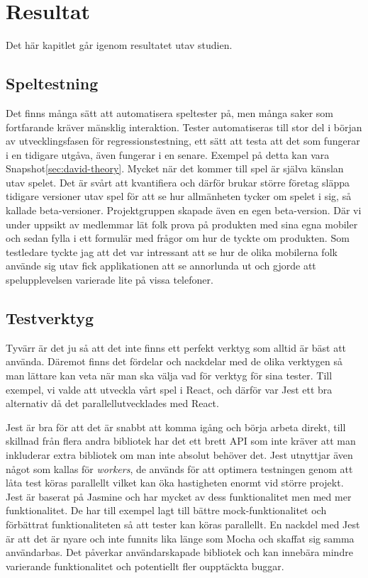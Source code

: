 \section{Resultat}
\label{sec:david-results}
Det här kapitlet går igenom resultatet utav studien.

\subsection{Speltestning}
Det finns många sätt att automatisera speltester på, men många saker som fortfarande kräver mänsklig interaktion. Tester automatiseras till stor del i början av utvecklingsfasen för regressionstestning, ett sätt att testa att det som fungerar i en tidigare utgåva, även fungerar i en senare. Exempel på detta kan vara Snapshot\ref{sec:david-theory}. Mycket när det kommer till spel är själva känslan utav spelet. Det är svårt att kvantifiera och därför brukar större företag släppa tidigare versioner utav spel för att se hur allmänheten tycker om spelet i sig, så kallade beta-versioner. Projektgruppen skapade även en egen beta-version. Där vi under uppsikt av medlemmar lät folk prova på produkten med sina egna mobiler och sedan fylla i ett formulär med frågor om hur de tyckte om produkten. Som testledare tyckte jag att det var intressant att se hur de olika mobilerna folk använde sig utav fick applikationen att se annorlunda ut och gjorde att spelupplevelsen varierade lite på vissa telefoner.

\subsection{Testverktyg}
Tyvärr är det ju så att det inte finns ett perfekt verktyg som alltid är bäst att använda. Däremot finns det fördelar och nackdelar med de olika verktygen så man lättare kan veta när man ska välja vad för verktyg för sina tester. Till exempel, vi valde att utveckla vårt spel i React, och därför var Jest ett bra alternativ då det parallellutvecklades med React. 

Jest är bra för att det är snabbt att komma igång och börja arbeta direkt, till skillnad från flera andra bibliotek har det ett brett API som inte kräver att man inkluderar extra bibliotek om man inte absolut behöver det. Jest utnyttjar även något som kallas för \textit{workers}, de används för att optimera testningen genom att låta test köras parallellt vilket kan öka hastigheten enormt vid större projekt. Jest är baserat på Jasmine och har mycket av dess funktionalitet men med mer funktionalitet. De har till exempel lagt till bättre mock-funktionalitet och förbättrat funktionaliteten så att tester kan köras parallellt. En nackdel med Jest är att det är nyare och inte funnits lika länge som Mocha och skaffat sig samma användarbas. Det påverkar användarskapade bibliotek och kan innebära mindre varierande funktionalitet och potentiellt fler oupptäckta buggar.